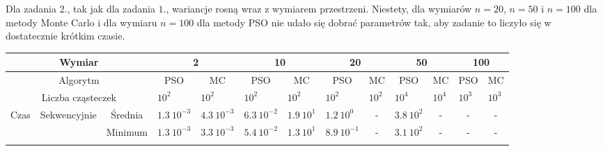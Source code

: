 \documentclass[11pt, a4paper, oneside]{article}
\begin{document}
Dla zadania $2$., tak jak dla zadania $1$., wariancje rosną wraz z wymiarem przestrzeni. Niestety, dla wymiarów $n=20$, $n=50$ i $n=100$ dla metody Monte Carlo i dla wymiaru $n=100$ dla metody PSO nie udało się dobrać parametrów tak, aby zadanie to liczyło się w dostatecznie krótkim czasie.

\begin{table}[h]
\scriptsize
\begin{adjustwidth}{0cm}{}
\centering
\begin{tabular}{|c|c|c|l|l|l|l|l|c|l|c|c|c|}
\hline
\multicolumn{3}{|c|}{Wymiar}                                      & \multicolumn{2}{c|}{2}                             & \multicolumn{2}{c|}{10}                            & \multicolumn{2}{c|}{20}                                  & \multicolumn{2}{c|}{50}                                  & \multicolumn{2}{c|}{100}                                      \\ \hline
\multicolumn{3}{|c|}{Algorytm}                                    & \multicolumn{1}{c|}{PSO} & \multicolumn{1}{c|}{MC} & \multicolumn{1}{c|}{PSO} & \multicolumn{1}{c|}{MC} & \multicolumn{1}{c|}{PSO} & MC                            & \multicolumn{1}{c|}{PSO} & MC                            & PSO                           & MC                            \\ \hline
\multicolumn{3}{|c|}{Liczba cząsteczek}                           & $10^{2}$                 & $10^{2}$                & $10^{2}$                 & $10^{2}$                & $10^{2}$                 & \multicolumn{1}{l|}{$10^{2}$} & $10^{4}$                 & \multicolumn{1}{l|}{$10^{4}$} & \multicolumn{1}{l|}{$10^{3}$} & \multicolumn{1}{l|}{$10^{3}$} \\ \hline
\multirow{8}{*}{Czas} & \multirow{4}{*}{Sekwencyjnie} & Średnia   & $1.3 \ 10^{-3}$          & $4.3 \ 10^{-3}$         & $6.3 \ 10^{-2}$          & $1.9 \ 10^{1}$          & $1.2 \ 10^{0}$           & -                             & $3.8 \ 10^{2}$           & -                             & -                             & -                             \\ \cline{3-13} 
                      &                               & Minimum   & $1.3 \ 10^{-3}$          & $3.3 \ 10^{-3}$         & $5.4 \ 10^{-2}$          & $1.3 \ 10^{1}$          & $8.9 \ 10^{-1}$          & -                             & $3.1 \ 10^{2}$           & -                             & -                             & -                             \\ \cline{3-13} 

\end{tabular}
\end{adjustwidth}
\end{table}
\end{document}
